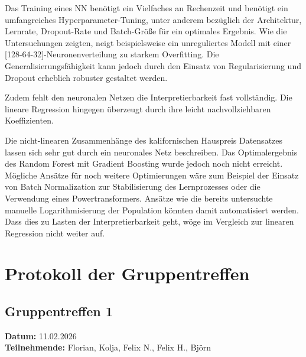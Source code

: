\documentclass[9pt,a4paper,twocolumn,twoside]{tau-class/tau}
\begin{document}
    
        Das Training eines NN benötigt ein Vielfaches an Rechenzeit und benötigt ein umfangreiches Hyperparameter-Tuning,
        unter anderem bezüglich der Architektur, Lernrate, Dropout-Rate und Batch-Größe für ein optimales Ergebnis.
        Wie die Untersuchungen zeigten, neigt beispielsweise ein unreguliertes Modell mit einer
        [128-64-32]-Neuronenverteilung zu starkem Overfitting.
        Die Generalisierungsfähigkeit kann jedoch durch den Einsatz von Regularisierung und Dropout erheblich robuster
        gestaltet werden.

        Zudem fehlt den neuronalen Netzen die Interpretierbarkeit fast vollständig.
        Die lineare Regression hingegen überzeugt durch ihre leicht nachvollziehbaren Koeffizienten.

        Die nicht-linearen Zusammenhänge des kalifornischen Hauspreis Datensatzes lassen sich sehr gut 
        durch ein neuronales Netz beschreiben. Das Optimalergebnis des Random Forest mit Gradient Boosting wurde jedoch noch nicht erreicht.
        Mögliche Ansätze für noch weitere Optimierungen wäre zum Beispiel der Einsatz von Batch Normalization zur
        Stabilisierung des Lernprozesses oder die Verwendung eines Powertransformers. Ansätze wie die bereits untersuchte manuelle
        Logarithmisierung der Population könnten damit automatisiert werden. Dass dies zu Lasten der Interpretierbarkeit geht,
        wöge im Vergleich zur linearen Regression nicht weiter auf. 

        
        


\newpage

%






\newpage
\newpage






\section{Protokoll der Gruppentreffen}

\subsection*{Gruppentreffen 1}
\textbf{Datum:} 11.02.2026 \\
\textbf{Teilnehmende:} Florian, Kolja, Felix N., Felix H., Björn
\end{document}
